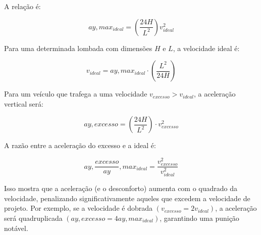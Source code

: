\documentclass[../resumo.tex]{subfiles}
\begin{document}
	A relação é:

	\[ ay, max_{ideal} = (\frac{24H}{L^2})v_{ideal}^2 \]

	Para uma determinada lombada com dimensões $H$ e $L$, a velocidade ideal é:

	\[ v_{ideal} = ay, max_{ideal}\cdot(\frac{L^2}{24H}) \]

	Para um veículo que trafega a uma velocidade $v_{excesso} > v_{ideal}$, a aceleração vertical será:

	\[ ay, excesso = (\frac{24H}{L^2})\cdot v_{excesso}^2 \]

	A razão entre a aceleração do excesso e a ideal é:

	\[ ay, \frac{excesso}{ay}, max_{ideal} = \frac{v_{excesso}^2}{v_{ideal}^2} \]

	Isso mostra que a aceleração (e o desconforto) aumenta com o quadrado da velocidade, penalizando
	significativamente aqueles que excedem a velocidade de projeto. Por exemplo, se a velocidade é dobrada
	$(v_{excesso} = 2v_{ideal})$, a aceleração será quadruplicada $(ay,excesso = 4ay, max_{ideal})$,
	garantindo uma punição notável.
\end{document}
